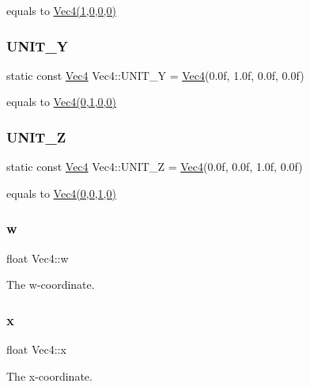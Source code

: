 equals to \hyperlink{classVec4}{Vec4(1,0,0,0)} \mbox{\label{classVec4_a13926e9e63a4875d69b2f54207143a0f}} 
\subsubsection{\texorpdfstring{U\+N\+I\+T\+\_\+Y}{UNIT\_Y}}
{\footnotesize\ttfamily static const \hyperlink{classVec4}{Vec4} Vec4\+::\+U\+N\+I\+T\+\_\+Y = \hyperlink{classVec4}{Vec4}(0.\+0f, 1.\+0f, 0.\+0f, 0.\+0f)\hspace{0.3cm}{\ttfamily [static]}}

equals to \hyperlink{classVec4}{Vec4(0,1,0,0)} \mbox{\label{classVec4_a12848e3af6852f84795922f3ffc36605}} 
\subsubsection{\texorpdfstring{U\+N\+I\+T\+\_\+Z}{UNIT\_Z}}
{\footnotesize\ttfamily static const \hyperlink{classVec4}{Vec4} Vec4\+::\+U\+N\+I\+T\+\_\+Z = \hyperlink{classVec4}{Vec4}(0.\+0f, 0.\+0f, 1.\+0f, 0.\+0f)\hspace{0.3cm}{\ttfamily [static]}}

equals to \hyperlink{classVec4}{Vec4(0,0,1,0)} \mbox{\label{classVec4_a37bee38ceffb78ccd3875ebf82bd84b2}} 
\subsubsection{\texorpdfstring{w}{w}}
{\footnotesize\ttfamily float Vec4\+::w}

The w-\/coordinate. \mbox{\label{classVec4_a3d9a7d18ac661965798b0c5bc32c56df}} 
\subsubsection{\texorpdfstring{x}{x}}
{\footnotesize\ttfamily float Vec4\+::x}

The x-\/coordinate. \mbox{\label{classVec4_a21c69aa0ef01a4ea985966c5527bbd69}} 
